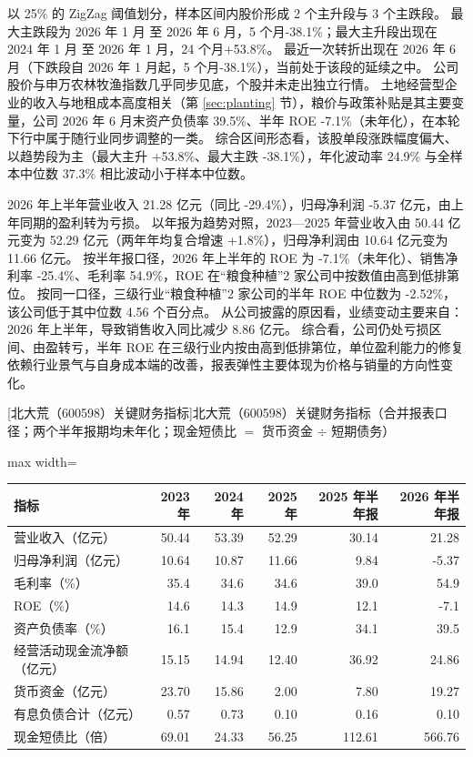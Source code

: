  以 25\% 的 ZigZag 阈值划分，样本区间内股价形成 2 个主升段与 3 个主跌段。 最大主跌段为 2026 年 1 月 至 2026 年 6 月，5 个月-38.1\%；最大主升段出现在 2024 年 1 月 至 2026 年 1 月，24 个月+53.8\%。 最近一次转折出现在 2026 年 6 月（下跌段自 2026 年 1 月起，5 个月-38.1\%），当前处于该段的延续之中。 公司股价与申万农林牧渔指数几乎同步见底，个股并未走出独立行情。 土地经营型企业的收入与地租成本高度相关（第 \ref{sec:planting} 节），粮价与政策补贴是其主要变量，公司 2026 年 6 月末资产负债率 39.5\%、半年 ROE -7.1\%（未年化），在本轮下行中属于随行业同步调整的一类。 综合区间形态看，该股单段涨跌幅度偏大、以趋势段为主（最大主升 +53.8\%、最大主跌 -38.1\%），年化波动率 24.9\% 与全样本中位数 37.3\% 相比波动小于样本中位数。

 2026 年上半年营业收入 21.28 亿元（同比 -29.4\%），归母净利润 -5.37 亿元，由上年同期的盈利转为亏损。 以年报为趋势对照，2023---2025 年营业收入由 50.44 亿元变为 52.29 亿元（两年年均复合增速 +1.8\%），归母净利润由 10.64 亿元变为 11.66 亿元。 按半年报口径，2026 年上半年的 ROE 为 -7.1\%（未年化）、销售净利率 -25.4\%、毛利率 54.9\%，ROE 在“粮食种植”2 家公司中按数值由高到低排第位。 按同一口径，三级行业“粮食种植”2 家公司的半年 ROE 中位数为 -2.52\%，该公司低于其中位数 4.56 个百分点。 从公司披露的原因看，业绩变动主要来自：2026 年上半年，导致销售收入同比减少 8.86 亿元。 综合看，公司仍处亏损区间、由盈转亏，半年 ROE 在三级行业内按由高到低排第位，单位盈利能力的修复依赖行业景气与自身成本端的改善，报表弹性主要体现为价格与销量的方向性变化。

\begin{center}\small\setlength{\tabcolsep}{3.4pt}
[北大荒（600598）关键财务指标]{北大荒（600598）关键财务指标（合并报表口径；两个半年报期均未年化；现金短债比 $=$ 货币资金 $\div$ 短期债务）}
\begin{adjustbox}{max width=\textwidth}
\begin{tabular}{@{}lrrrrr@{}}
\toprule
指标 & 2023 年 & 2024 年 & 2025 年 & 2025 年半年报 & 2026 年半年报 \\
\midrule
营业收入（亿元） & 50.44 & 53.39 & 52.29 & 30.14 & 21.28 \\
归母净利润（亿元） & 10.64 & 10.87 & 11.66 & 9.84 & -5.37 \\
毛利率（\%） & 35.4 & 34.6 & 34.6 & 39.0 & 54.9 \\
ROE（\%） & 14.6 & 14.3 & 14.9 & 12.1 & -7.1 \\
资产负债率（\%） & 16.1 & 15.4 & 12.9 & 34.1 & 39.5 \\
经营活动现金流净额（亿元） & 15.15 & 14.94 & 12.40 & 36.92 & 24.86 \\
货币资金（亿元） & 23.70 & 15.86 & 2.00 & 7.80 & 19.27 \\
有息负债合计（亿元） & 0.57 & 0.73 & 0.10 & 0.16 & 0.10 \\
现金短债比（倍） & 69.01 & 24.33 & 56.25 & 112.61 & 566.76 \\
\bottomrule
\end{tabular}
\end{adjustbox}
\end{center}

